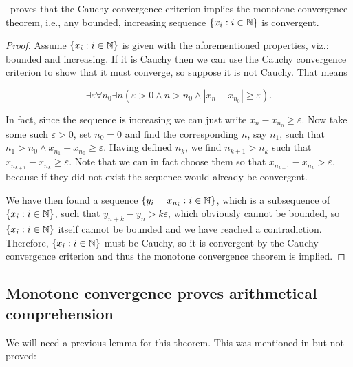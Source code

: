 \documentclass[../main.tex]{memoir}
\begin{document}
\begin{theorem}
  \label{thm:cc-mc}
  \rca\ proves that the Cauchy convergence criterion implies the monotone convergence theorem, i.e., any bounded, increasing sequence $\{x_i: i \in \mathbb{N}\}$ is convergent.
\end{theorem}
\begin{proof}
  Assume $\{x_i: i \in \mathbb{N}\}$ is given with the aforementioned properties, viz.: bounded and increasing. If it is Cauchy then we can use the Cauchy convergence criterion to show that it must converge, so suppose it is not Cauchy. That means

  \[ \exists \varepsilon \forall n_0 \exists n (\varepsilon > 0 \land n > n_0 \land |x_n - x_{n_0}| \ge \varepsilon). \]

  In fact, since the sequence is increasing we can just write $x_n - x_{n_0} \ge \varepsilon$. Now take some such $\varepsilon > 0$, set $n_0 = 0$ and find the corresponding $n$, say $n_1$, such that $n_1 > n_0 \land x_{n_1} - x_{n_0} \ge \varepsilon$. Having defined $n_k$, we find $n_{k + 1} > n_k$ such that $x_{n_{k + 1}} - x_{n_k} \ge \varepsilon$. Note that we can in fact choose them so that $x_{n_{k + 1}} - x_{n_k} > \varepsilon$, because if they did not exist the sequence would already be convergent.

  We have then found a sequence $\{y_i = x_{n_i}: i \in \mathbb{N}\}$, which is a subsequence of $\{x_i: i \in \mathbb{N}\}$, such that $y_{n + k} - y_n > k \varepsilon$, which obviously cannot be bounded, so $\{x_i: i \in \mathbb{N}\}$ itself cannot be bounded and we have reached a contradiction. Therefore, $\{x_i: i \in \mathbb{N}\}$ must be Cauchy, so it is convergent by the Cauchy convergence criterion and thus the monotone convergence theorem is implied.
\end{proof}

\subsection{Monotone convergence proves arithmetical comprehension}

We will need a previous lemma for this theorem. This was mentioned in  but not proved:
\end{document}
